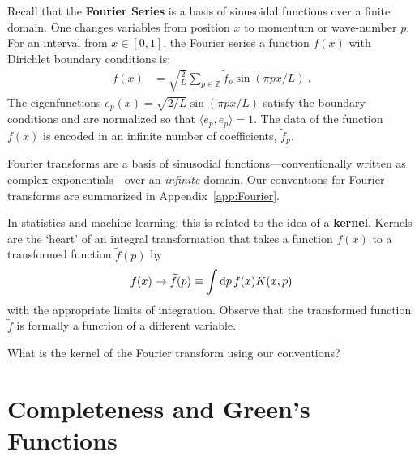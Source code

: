Recall that the \textbf{Fourier Series} is a basis of sinusoidal functions over a finite domain. One changes variables from position $x$ to momentum or wave-number $p$. For an interval from $x\in [0,1]$, the Fourier series a function $f(x)$ with Dirichlet boundary conditions is:
\begin{align}
  f(x) &= \sqrt{\frac{2}{L}} 
  \sum_{p \in \mathbb{Z}}  
  \tilde f_p \sin(\pi p x/L) \ .
\end{align}
The eigenfunctions $e_p(x)=\sqrt{2/L}\sin(\pi p x/L)$ satisfy the boundary conditions and are normalized so that $\langle e_p,e_p\rangle = 1$. The data of the function $f(x)$ is encoded in an infinite number of coefficients, $\tilde f_p$.

Fourier transforms are a basis of sinusodial functions---conventionally written as complex exponentials---over an \emph{infinite} domain. Our conventions for Fourier transforms are summarized in Appendix~\ref{app:Fourier}. 


In statistics and machine learning, this is related to the idea of a \textbf{kernel}. Kernels are the `heart' of an integral transformation that takes a function $f(x)$ to a transformed function $\tilde f(p)$ by
\begin{align}
  f(x) \to \widetilde f(p) \equiv \int \operatorname{d}\mkern-3mu^{}\mkern-1mu{p}\, f(x) K(x,p) 
\end{align}
with the appropriate limits of integration. Observe that the transformed function $\tilde f$ is formally a function of a different variable. 

\begin{exercise}
What is the kernel of the Fourier transform using our conventions?
\end{exercise}

\section{Completeness and Green's Functions}

